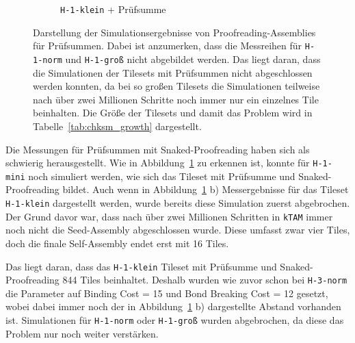 \begin{figure}
\begin{subfigure}[b]{0.49\textwidth}
        \caption{\texttt{H-1-klein} + Prüfsumme}
    \end{subfigure}
    \caption[Simulationsergebnisse für Proofreading-Assemblies mit Prüfsummen.]{Darstellung der Simulationsergebnisse von Proofreading-Assemblies für Prüfsummen. Dabei ist anzumerken, dass die Messreihen für \texttt{H-1-norm} und \texttt{H-1-groß} nicht abgebildet werden. Das liegt daran, dass die Simulationen der Tilesets mit Prüfsummen nicht abgeschlossen werden konnten, da bei so großen Tilesets die Simulationen teilweise nach über zwei Millionen Schritte noch immer nur ein einzelnes Tile beinhalten. Die Größe der Tilesets und damit das Problem wird in Tabelle~\ref{tab:chksm_growth} dargestellt.}
    \label{fig:proof_simulation_chksm}
\end{figure}

Die Messungen für Prüfsummen mit Snaked-Proofreading haben sich als schwierig herausgestellt. Wie in Abbildung~\ref{fig:proof_simulation_chksm} zu erkennen ist, konnte für \texttt{H-1-mini} noch simuliert werden, wie sich das Tileset mit Prüfsumme und Snaked-Proofreading bildet. Auch wenn in Abbildung~\ref{fig:proof_simulation_chksm} b) Messergebnisse für das Tileset \texttt{H-1-klein} dargestellt werden, wurde bereits diese Simulation zuerst abgebrochen. Der Grund davor war, dass nach über zwei Millionen Schritten in \texttt{kTAM} immer noch nicht die Seed-Assembly abgeschlossen wurde. Diese umfasst zwar vier Tiles, doch die finale Self-Assembly endet erst mit 16 Tiles. 

Das liegt daran, dass das \texttt{H-1-klein} Tileset mit Prüfsumme und Snaked-Proofreading 844 Tiles beinhaltet. Deshalb wurden wie zuvor schon bei \texttt{H-3-norm} die Parameter auf Binding Cost = 15 und Bond Breaking Cost = 12 gesetzt, wobei dabei immer noch der in Abbildung~\ref{fig:proof_simulation_chksm} b) dargestellte Abstand vorhanden ist. Simulationen für \texttt{H-1-norm} oder \texttt{H-1-groß} wurden abgebrochen, da diese das Problem nur noch weiter verstärken. 

